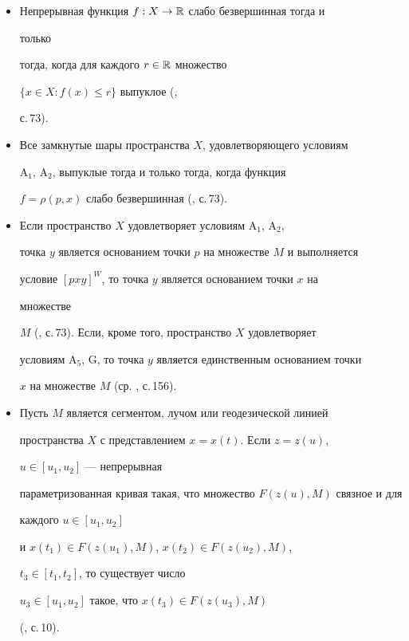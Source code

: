 \begin{itemize} 


\item[1.] Непрерывная функция $f:X\to\Bbb R$ слабо безвершинная тогда и 


только 


тогда, когда для каждого $r\in\Bbb R$ множество 


$\{x\in X:f(x)\le r\}$ выпуклое (\cite{1}, 


с.\,73). 


\item[2.] Все замкнутые шары пространства $X$, удовлетворяющего условиям 


A${}_1$, A${}_2$, выпуклые тогда и только тогда, когда функция 


$f=\rho(p,x)$ слабо безвершинная (\cite{1}, с.\,73). 


\item[3.] Если пространство $X$ удовлетворяет условиям A${}_1$, A${}_2$, 


точка $y$ является основанием точки $p$ на множестве $M$ и выполняется 


условие $[pxy]^W$, то точка $y$ является основанием точки $x$ на 


множестве 


$M$ (\cite{1}, с.\,73). Если, кроме того, пространство $X$ удовлетворяет 


условиям A${}_5$, G, то точка $y$ является единственным основанием точки 


$x$ на множестве $M$ (ср. \cite{2}, с.\,156). 


\item[4.] Пусть $M$ является сегментом, лучом или геодезической линией 


пространства $X$ с представлением $x=x(t)$. Если $z=z(u)$, 


$u\in[u_1,u_2]$ --- непрерывная 


параметризованная кривая такая, что множество $F(z(u),M)$ связное и для 


каждого $u\in[u_1,u_2]$ 


и $x(t_1)\in F(z(u_1),M)$, $x(t_2)\in F(z(u_2),M)$, 


$t_3\in[t_1,t_2]$, то существует число 


$u_3\in[u_1,u_2]$ такое, что $x(t_3)\in F(z(u_3),M)$ 


(\cite{1}, с.\,10). 


\end{itemize} 


